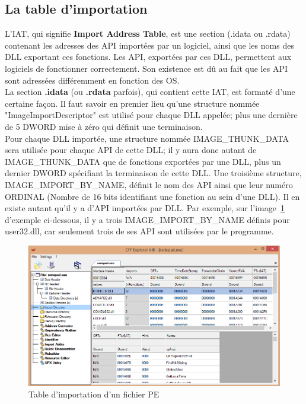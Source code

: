 \subsection{La table d'importation}
L'IAT, qui signifie \textbf{Import Address Table}, est une section (.idata ou .rdata) contenant les adresses des API importées par un logiciel, ainsi que les noms des DLL exportant ces fonctions. Les API, exportées par ces DLL, permettent aux logiciels de fonctionner correctement. Son existence est dû au fait que les API sont adressées différemment en fonction des OS.\\
La section \textbf{.idata} (ou \textbf{.rdata} parfois), qui contient cette IAT, est formaté d'une certaine façon. Il faut savoir en premier lieu qu'une structure nommée "ImageImportDescriptor" est utilisé pour chaque DLL appelée; plus une dernière de 5 DWORD mise à zéro qui définit une terminaison.\\
Pour chaque DLL importée, une structure nommée IMAGE\_THUNK\_DATA sera utilisée pour chaque API de cette
DLL; il y aura donc autant de IMAGE\_THUNK\_DATA que de fonctions exportées par une DLL, plus un dernier
DWORD spécifiant la terminaison de cette DLL. Une troisième structure, IMAGE\_IMPORT\_BY\_NAME, définit le nom des API ainsi que leur numéro ORDINAL (Nombre de 16 bits identifiant une fonction au sein d'une DLL). Il en existe autant qu'il y a d'API importées par DLL.
Par exemple, sur l'image~\ref{fig :IAT} d'exemple ci-dessous, il y a trois IMAGE\_IMPORT\_BY\_NAME définis pour user32.dll, car seulement trois de ses API sont utilisées par le programme.
\begin{figure}[H]
\begin{center}
\includegraphics[scale=0.6]{Figures/pic7.PNG}
\caption{Table d'importation d'un fichier PE}
\label{fig :IAT} 
\end{center}
\end{figure}

